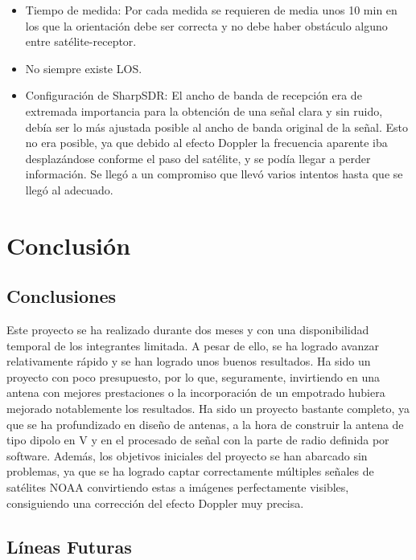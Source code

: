 \documentclass[a4paper,openright,12pt]{article}
\begin{document}
\begin{itemize}
\begin{itemize}
        \item Tiempo de medida: Por cada medida se requieren de media unos 10 min en los que la orientación debe ser correcta y no debe haber obstáculo alguno entre satélite-receptor.
        \item No siempre existe LOS.
        \item Configuración de SharpSDR: El ancho de banda de recepción era de extremada importancia para la obtención de una señal clara y sin ruido, debía ser lo más ajustada posible al ancho de banda original de la señal. Esto no era posible, ya que debido al efecto Doppler la frecuencia aparente iba desplazándose conforme el paso del satélite, y se podía llegar a perder información. Se llegó a un compromiso que llevó varios intentos hasta que se llegó al adecuado.
    \end{itemize}
    
\end{itemize}

\newpage
\section{Conclusión}

\subsection{Conclusiones}
Este proyecto se ha realizado durante dos meses y con una disponibilidad temporal de los integrantes limitada. A pesar de ello, se ha logrado avanzar relativamente rápido y se han logrado unos buenos resultados. Ha sido un proyecto con poco presupuesto, por lo que, seguramente, invirtiendo en una antena con mejores prestaciones o la incorporación de un empotrado hubiera mejorado notablemente los resultados.
Ha sido un proyecto bastante completo, ya que se ha profundizado en diseño de antenas, a la hora de construir la antena de tipo dipolo en V y en el procesado de señal con la parte de radio definida por software. Además, los objetivos iniciales del proyecto se han abarcado sin problemas, ya que se ha logrado captar correctamente múltiples señales de satélites NOAA convirtiendo estas a imágenes perfectamente visibles, consiguiendo una corrección del efecto Doppler muy precisa.

\subsection{Líneas Futuras}
\end{document}
